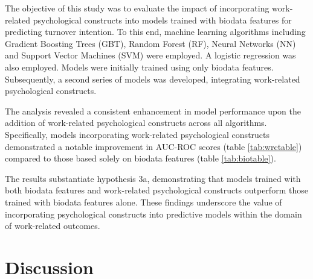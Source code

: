 \documentclass[
  man]{apa7}
\begin{document}
The objective of this study was to evaluate the impact of incorporating work-related psychological constructs into models trained with biodata features for predicting turnover intention. To this end, machine learning algorithms including Gradient Boosting Trees (GBT), Random Forest (RF), Neural Networks (NN) and Support Vector Machines (SVM) were employed. A logistic regression was also employed. Models were initially trained using only biodata features. Subsequently, a second series of models was developed, integrating work-related psychological constructs.

The analysis revealed a consistent enhancement in model performance upon the addition of work-related psychological constructs across all algorithms. Specifically, models incorporating work-related psychological constructs demonstrated a notable improvement in AUC-ROC scores (table \ref{tab:wrctable}) compared to those based solely on biodata features (table \ref{tab:biotable}).

The results substantiate hypothesis 3a, demonstrating that models trained with both biodata features and work-related psychological constructs outperform those trained with biodata features alone. These findings underscore the value of incorporating psychological constructs into predictive models within the domain of work-related outcomes.

\hypertarget{discussion}{%
\section{Discussion}\label{discussion}}
\end{document}

